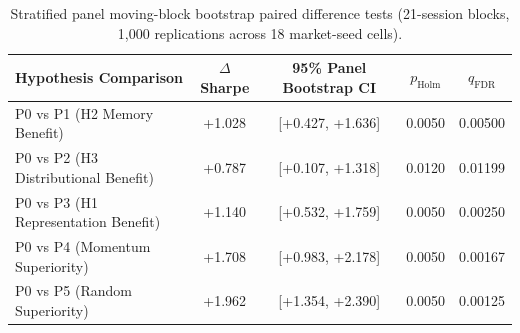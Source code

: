 \begin{table}[ht]
\centering
\small
\begin{tabular}{lcccc}
\toprule
\textbf{Hypothesis Comparison} & \textbf{$\Delta$Sharpe} & \textbf{95\% Panel Bootstrap CI} & \textbf{$p_{\text{Holm}}$} & \textbf{$q_{\text{FDR}}$} \\
\midrule
P0 vs P1 (H2 Memory Benefit) & +1.028 & [+0.427, +1.636] & 0.0050 & 0.00500 \\
P0 vs P2 (H3 Distributional Benefit) & +0.787 & [+0.107, +1.318] & 0.0120 & 0.01199 \\
P0 vs P3 (H1 Representation Benefit) & +1.140 & [+0.532, +1.759] & 0.0050 & 0.00250 \\
P0 vs P4 (Momentum Superiority) & +1.708 & [+0.983, +2.178] & 0.0050 & 0.00167 \\
P0 vs P5 (Random Superiority) & +1.962 & [+1.354, +2.390] & 0.0050 & 0.00125 \\
\bottomrule
\end{tabular}
\caption{Stratified panel moving-block bootstrap paired difference tests (21-session blocks, 1,000 replications across 18 market-seed cells).}
\label{tab:statistical_bootstrap}
\end{table}
